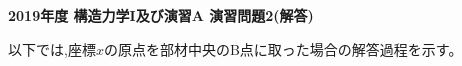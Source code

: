 \documentclass[10pt,a4j]{jarticle}
\newlength{\minitwocolumn}
\begin{document}
\newcommand{\fat}[1]{\mbox{\boldmath $#1$}}
\newcommand{\D}{\partial}
\newcommand{\w}{\omega}
\newcommand{\ga}{\alpha}
\newcommand{\gb}{\beta}
\newcommand{\gx}{\xi}
\newcommand{\gz}{\zeta}
\newcommand{\vhat}[1]{\hat{\fat{#1}}}
\newcommand{\spc}{\vspace{0.7\baselineskip}}
\newcommand{\halfspc}{\vspace{0.3\baselineskip}}

\pagestyle{empty}
\newcommand{\twofig}[2]
 {
   \begin{figure}
     \begin{minipage}[t]{\minitwocolumn}
         \begin{center}   #1
         \end{center}
     \end{minipage}
         \hspace{\columnsep}
     \begin{minipage}[t]{\minitwocolumn}
         \begin{center} #2
         \end{center}
     \end{minipage}
   \end{figure}
 }
\begin{center}
{\Large \bf 2019年度 構造力学I及び演習A 演習問題2(解答)} \\
\end{center}
\vspace{15mm}
以下では,座標$x$の原点を部材中央のB点に取った場合の解答過程を示す。
\end{document}
